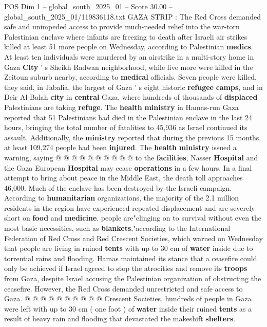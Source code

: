 \begin{textsample}{POS Dim 1 – global\_south\_2025\_01 – Score 30.00 – global\_south\_2025\_01/119836118.txt}  \label{ex:f1_pos_293}
GAZA STRIP : The Red Cross demanded safe and unimpeded access to provide much-needed relief into the war-torn Palestinian enclave where infants are freezing to death after Israeli air strikes killed at least 51 more people on Wednesday, according to Palestinian \textbf{medics}.
At least ten individuals were murdered by an airstrike in a multi-story home in Gaza \textbf{City} ' s Sheikh Radwan neighborhood, while five more were killed in the Zeitoun suburb nearby, according to \textbf{medical} officials.
Seven people were killed, they said, in Jabalia, the largest of Gaza ' s eight historic \textbf{refugee} \textbf{camps}, and in Deir Al-Balah \textbf{city} in \textbf{central} Gaza, where hundreds of thousands of \textbf{displaced} Palestinians are taking \textbf{refuge}.
The \textbf{health} \textbf{ministry} in Hamas-run Gaza reported that 51 Palestinians had died in the Palestinian enclave in the last 24 hours, bringing the total number of fatalities to 45,936 as Israel continued its assault.
Additionally, the \textbf{ministry} reported that during the previous 15 months, at least 109,274 people had been \textbf{injured}.
The \textbf{health} \textbf{ministry} issued a warning, saying @ @ @ @ @ @ @ @ @ @ to the \textbf{facilities}, Nasser \textbf{Hospital} and the Gaza European \textbf{Hospital} may cease \textbf{operations} in a few hours.
In a final attempt to bring about peace in the Middle East, the death toll approaches 46,000.
Much of the enclave has been destroyed by the Israeli campaign.
According to \textbf{humanitarian} organizations, the majority of the 2.1 million residents in the region have experienced repeated displacement and are severely short on \textbf{food} and \textbf{medicine}. people are"clinging on to survival without even the most basic necessities, such as \textbf{blankets},"according to the International Federation of Red Cross and Red Crescent Societies, which warned on Wednesday that people are living in ruined \textbf{tents} with up to 30 cm of \textbf{water} inside due to torrential rains and flooding.
Hamas maintained its stance that a ceasefire could only be achieved if Israel agreed to stop the atrocities and remove its \textbf{troops} from Gaza, despite Israel accusing the Palestinian organization of obstructing the ceasefire.
However, the Red Cross demanded unrestricted and safe access to Gaza. @ @ @ @ @ @ @ @ @ @ Crescent Societies, hundreds of people in Gaza were left with up to 30 cm ( one foot ) of \textbf{water} inside their ruined \textbf{tents} as a result of heavy rain and flooding that devastated the makeshift \textbf{shelters}.

\end{textsample}
